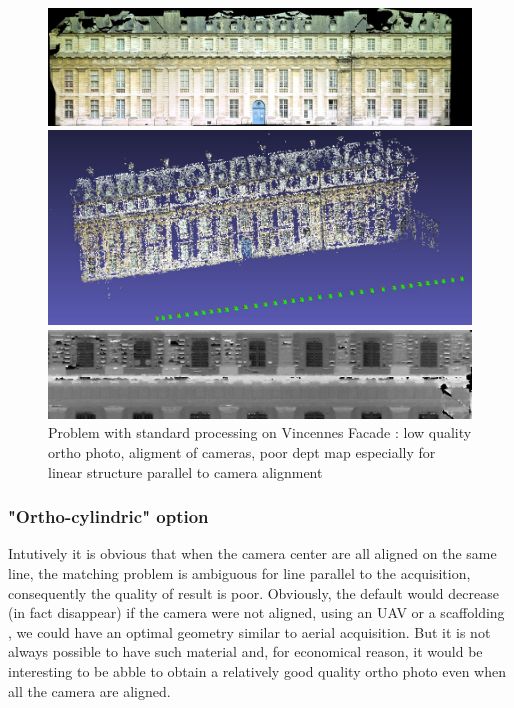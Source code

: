 \begin{figure}
\begin{center}
\includegraphics[width=160mm]{FIGS/Vincennes/Ortho-Moche.jpg}

\vspace{0.3cm}
\includegraphics[width=160mm]{FIGS/Vincennes/CamFace1.jpg}

\vspace{0.3cm}
\includegraphics[width=160mm]{FIGS/Vincennes/MNT-Moche.jpg}

\end{center}
\caption{Problem with standard processing on Vincennes Facade : low quality ortho photo,
aligment of cameras, poor dept map especially for linear structure parallel to camera alignment}
\label{FIG:Pb:Vincenne}
\end{figure}


\subsubsection{"Ortho-cylindric" option}

Intutively it  is obvious that when the camera center are all aligned on the same line,
the matching problem is  ambiguous for line parallel to the acquisition, consequently
the quality of result is poor. 
Obviously, the default would decrease (in fact disappear) if the camera were not
aligned, using an UAV or a scaffolding , we could have an optimal geometry similar
to aerial acquisition. But it is not always possible to have such material and, for economical reason, 
it would be interesting to be abble to obtain a relatively good quality ortho photo even when
all the camera are aligned.

